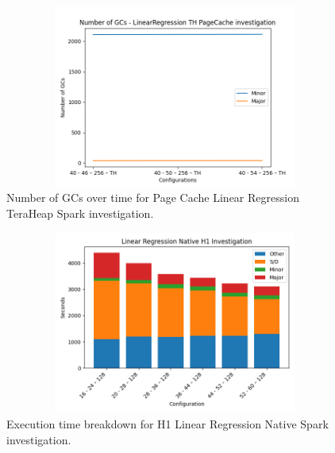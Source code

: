 \begin{figure}[ht!]
    \includegraphics[width=12cm,height=6cm]{./fig/gcs_linr_pc_th.png}
    \caption{Number of GCs over time for Page Cache Linear Regression
    TeraHeap Spark investigation.}
    \label{fig:gcs_linr_pc_th}
\end{figure}

\begin{figure}[ht!]
    \includegraphics[width=12cm,height=6cm]{./fig/linr_h1_native.png}
    \caption{Execution time breakdown for H1 Linear Regression Native
    Spark investigation.}
    \label{fig:linr_h1_native}
\end{figure}

